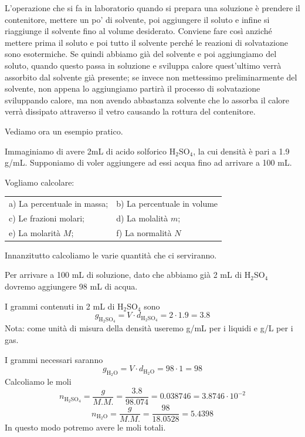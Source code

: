 \vspace{0.4cm}L'operazione che si fa in laboratorio quando si prepara una soluzione è prendere il contenitore, mettere un po' di solvente, poi aggiungere il soluto e infine si riaggiunge il solvente fino al volume desiderato. Conviene fare così anziché mettere prima il soluto e poi tutto il solvente perché le reazioni di solvatazione sono esotermiche. Se quindi abbiamo già del solvente e poi aggiungiamo del soluto, quando questo passa in soluzione e sviluppa calore quest'ultimo verrà assorbito dal solvente già presente; se invece non mettessimo preliminarmente del solvente, non appena lo aggiungiamo partirà il processo di solvatazione sviluppando calore, ma non avendo abbastanza solvente che lo assorba il calore verrà dissipato attraverso il vetro causando la rottura del contenitore.

\vspace{0.2cm}Vediamo ora un esempio pratico.

Immaginiamo di avere 2mL di acido solforico H$_2$SO$_4$, la cui densità è pari a 1.9 g/mL. Supponiamo di voler aggiungere ad essi acqua fino ad arrivare a 100 mL.

Vogliamo calcolare:

\begin{center}
    \begin{tabular}{p{7cm}p{7cm}}
    a) La percentuale in massa; & b) La percentuale in volume\\[0.2cm]
    c) Le frazioni molari; & d) La molalità $m$;\\[0.2cm]
    e) La molarità $M$; & f) La normalità $N$
    \end{tabular}
\end{center}

Innanzitutto calcoliamo le varie quantità che ci serviranno.

Per arrivare a 100 mL di soluzione, dato che abbiamo già 2 mL di H$_2$SO$_4$ dovremo aggiungere 98 mL di acqua.

I grammi contenuti in 2 mL di H$_2$SO$_4$ sono
$$g_{\text{H}_2\text{SO}_4}=V\cdot d_{\text{H}_2\text{SO}_4}= 2 \cdot 1.9=3.8$$
Nota: come unità di misura della densità useremo g/mL per i liquidi e g/L per i gas.

I grammi necessari saranno
$$g_{\text{H}_2\text{O}}= V \cdot d_{\text{H}_2\text{O}}= 98 \cdot 1 = 98$$
Calcoliamo le moli
$$n_{\text{H}_2\text{SO}_4}=\frac{g}{M.M.}=\frac{3.8}{98.074}=0.038746=3.8746 \cdot 10^{-2}$$
$$n_{\text{H}_2\text{O}}=\frac{g}{M.M.}=\frac{98}{18.0528}=5.4398$$
In questo modo potremo avere le moli totali.

